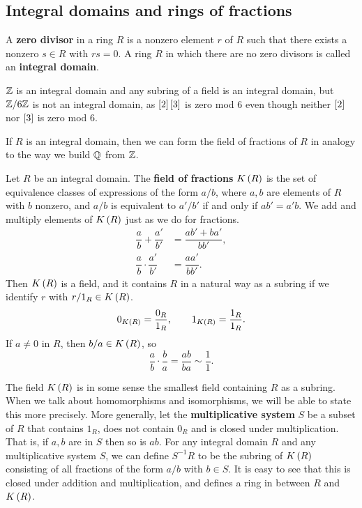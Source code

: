 \pagebreak

\subsection{Integral domains and rings of fractions}


\begin{definition}
A \textbf{zero divisor} in a ring $ R $ is a nonzero element $ r $ of $ R $ such that there exists a nonzero $ s \in R $ with $ rs = 0 $. A ring $ R $ in which there are no zero divisors is called an \textbf{integral domain}.
\end{definition}

\begin{example*}
$ \Z $ is an integral domain and any subring of a field is an integral domain, but $ \Z / 6\Z $ is not an integral domain, as $ \sb{2}\sb{3} $ is zero mod $ 6 $ even though neither $ \sb{2} $ nor $ \sb{3} $ is zero mod $ 6 $.
\end{example*}

If $ R $ is an integral domain, then we can form the field of fractions of $ R $ in analogy to the way we build $ \Q $ from $ \Z $.

\begin{definition}
Let $ R $ be an integral domain. The \textbf{field of fractions} $ K\rb{R} $ is the set of equivalence classes of expressions of the form $ a / b $, where $ a, b $ are elements of $ R $ with $ b $ nonzero, and $ a / b $ is equivalent to $ a' / b' $ if and only if $ ab' = a'b $. We add and multiply elements of $ K\rb{R} $ just as we do for fractions.
\begin{align*}
\dfrac{a}{b} + \dfrac{a'}{b'} & = \dfrac{ab' + ba'}{bb'}, \\
\dfrac{a}{b} \cdot \dfrac{a'}{b'} & = \dfrac{aa'}{bb'}.
\end{align*}
Then $ K\rb{R} $ is a field, and it contains $ R $ in a natural way as a subring if we identify $ r $ with $ r / 1_R \in K\rb{R} $.
$$ 0_{K\rb{R}} = \dfrac{0_R}{1_R}, \qquad 1_{K\rb{R}} = \dfrac{1_R}{1_R}. $$
If $ a \ne 0 $ in $ R $, then $ b / a \in K\rb{R} $, so
$$ \dfrac{a}{b} \cdot \dfrac{b}{a} = \dfrac{ab}{ba} \sim \dfrac{1}{1}. $$
\end{definition}

The field $ K\rb{R} $ is in some sense the smallest field containing $ R $ as a subring. When we talk about homomorphisms and isomorphisms, we will be able to state this more precisely. More generally, let the \textbf{multiplicative system} $ S $ be a subset of $ R $ that contains $ 1_R $, does not contain $ 0_R $ and is closed under multiplication. That is, if $ a, b $ are in $ S $ then so is $ ab $. For any integral domain $ R $ and any multiplicative system $ S $, we can define $ S^{-1}R $ to be the subring of $ K\rb{R} $ consisting of all fractions of the form $ a / b $ with $ b \in S $. It is easy to see that this is closed under addition and multiplication, and defines a ring in between $ R $ and $ K\rb{R} $.

